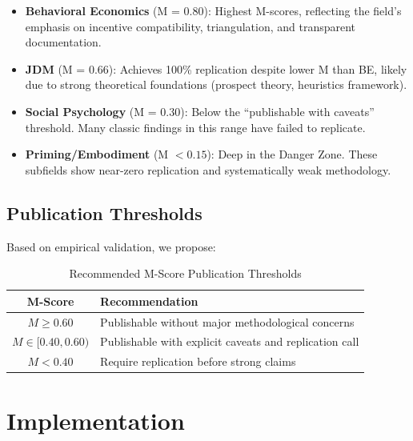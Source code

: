 \documentclass[11pt,a4paper]{article}
\begin{document}
\begin{itemize}
    \item \textbf{Behavioral Economics} (M = 0.80): Highest M-scores, reflecting the field's emphasis on incentive compatibility, triangulation, and transparent documentation.

    \item \textbf{JDM} (M = 0.66): Achieves 100\% replication despite lower M than BE, likely due to strong theoretical foundations (prospect theory, heuristics framework).

    \item \textbf{Social Psychology} (M = 0.30): Below the ``publishable with caveats'' threshold. Many classic findings in this range have failed to replicate.

    \item \textbf{Priming/Embodiment} (M $< 0.15$): Deep in the Danger Zone. These subfields show near-zero replication and systematically weak methodology.
\end{itemize}

\subsection{Publication Thresholds}

Based on empirical validation, we propose:

\begin{table}[h]
\centering
\caption{Recommended M-Score Publication Thresholds}
\label{tab:thresholds}
\begin{tabular}{cl}
\toprule
\textbf{M-Score} & \textbf{Recommendation} \\
\midrule
$M \geq 0.60$ & Publishable without major methodological concerns \\
$M \in [0.40, 0.60)$ & Publishable with explicit caveats and replication call \\
$M < 0.40$ & Require replication before strong claims \\
\bottomrule
\end{tabular}
\end{table}


\section{Implementation}
\label{sec:implementation}
\end{document}
